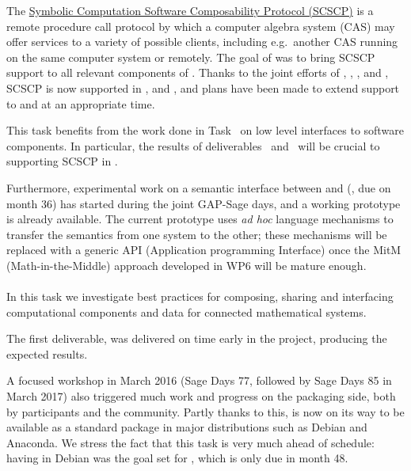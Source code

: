 \documentclass{deliverablereport}
\begin{document}
  The
  \href{http://www.symbolic-computing.org/science/index.php/SCSCP}{Symbolic
    Computation Software Composability Protocol (SCSCP)} is a remote
  procedure call protocol by which a computer algebra system (CAS) may
  offer services to a variety of possible clients, including e.g.\
  another CAS running on the same computer system or remotely. The
  goal of \delivref{component-architecture}{scscp-sage} was to bring
  SCSCP support to all relevant components of \ODK. Thanks to the
  joint efforts of \site{SA}, \site{UV}, \site{JU}, \site{UG} and
  \site{UB}, SCSCP is now supported in \GAP, \Sage and \MathHub, and
  plans have been made to extend support to \Singular and \PariGP at
  an appropriate time. 

  This task benefits from the work done in
  Task~ on low level interfaces to software
  components. In particular, the results of
  deliverables~
  and~ will be crucial to supporting
  SCSCP in \PariGP.

  Furthermore, experimental work on a semantic interface between \GAP
  and \Sage
  (, due
  on month 36) has started during the joint GAP-Sage days, and a
  working prototype is already available. The current prototype uses
  \emph{ad hoc} language mechanisms to transfer the semantics from one
  system to the other; these mechanisms will be replaced with a
  generic API (Application programming Interface) once the MitM
  (Math-in-the-Middle) approach developed in WP6 will be mature
  enough.

  \paragraph{}
  \label{component-architecture@mod-packaging}
  In this task we investigate best practices for composing, sharing
  and interfacing computational components and data for connected
  mathematical systems.

  The first deliverable,
   was
  delivered on time early in the project, producing the expected
  results.

  A focused workshop in March 2016 (Sage Days 77, followed by Sage
  Days 85 in March 2017) also triggered much work and progress on the
  packaging side, both by \ODK participants and the community. Partly
  thanks to this, \Sage is now on its way to be available as a
  standard package in major distributions such as Debian and
  Anaconda. We stress the fact that this task is very much ahead of
  schedule: having \Sage in Debian was the goal set for
  , which is only
  due in month 48.
\end{document}
